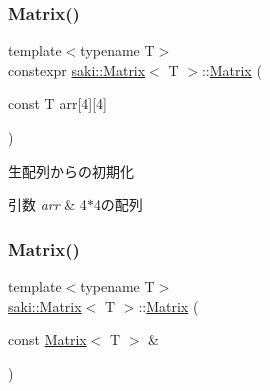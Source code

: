 \subsubsection{\texorpdfstring{Matrix()}{Matrix()}\hspace{0.1cm}{\footnotesize\ttfamily [3/5]}}
{\footnotesize\ttfamily template$<$typename T$>$ \\
constexpr \mbox{\hyperlink{classsaki_1_1_matrix}{saki\+::\+Matrix}}$<$ T $>$\+::\mbox{\hyperlink{classsaki_1_1_matrix}{Matrix}} (\begin{DoxyParamCaption}\item[{const T}]{arr\mbox{[}4\mbox{]}\mbox{[}4\mbox{]} }\end{DoxyParamCaption})\hspace{0.3cm}{\ttfamily [inline]}}



生配列からの初期化 


\begin{DoxyParams}{引数}
{\em arr} & 4$\ast$4の配列 \\
\hline
\end{DoxyParams}
\mbox{\label{classsaki_1_1_matrix_a08d28bd14af9be6650325574a20101d7}} 
\subsubsection{\texorpdfstring{Matrix()}{Matrix()}\hspace{0.1cm}{\footnotesize\ttfamily [4/5]}}
{\footnotesize\ttfamily template$<$typename T$>$ \\
\mbox{\hyperlink{classsaki_1_1_matrix}{saki\+::\+Matrix}}$<$ T $>$\+::\mbox{\hyperlink{classsaki_1_1_matrix}{Matrix}} (\begin{DoxyParamCaption}\item[{const \mbox{\hyperlink{classsaki_1_1_matrix}{Matrix}}$<$ T $>$ \&}]{ }\end{DoxyParamCaption})\hspace{0.3cm}{\ttfamily [default]}}

\mbox{\label{classsaki_1_1_matrix_aced6f31e05917c2c41305dd0be082f8b}} 
